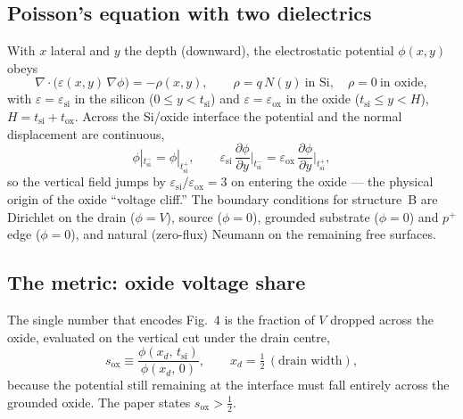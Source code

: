 \documentclass[11pt]{article}
\newcommand{\eox}{\varepsilon_{\mathrm{ox}}}
\newcommand{\esi}{\varepsilon_{\mathrm{si}}}
\newcommand{\tox}{t_{\mathrm{ox}}}
\newcommand{\tsi}{t_{\mathrm{si}}}
\begin{document}
\subsection{Poisson's equation with two dielectrics}
With $x$ lateral and $y$ the depth (downward), the electrostatic potential
$\phi(x,y)$ obeys
\begin{equation}
\nabla\!\cdot\!\big(\varepsilon(x,y)\,\nabla\phi\big) = -\rho(x,y),
\qquad
\rho = q\,N(y)\ \text{in Si},\quad \rho=0\ \text{in oxide},
\label{eq:poisson}
\end{equation}
with $\varepsilon=\esi$ in the silicon ($0\le y<\tsi$) and $\varepsilon=\eox$ in
the oxide ($\tsi\le y<H$), $H=\tsi+\tox$. Across the Si/oxide interface the
potential and the normal displacement are continuous,
\begin{equation}
\phi|_{\tsi^-}=\phi|_{\tsi^+},
\qquad
\esi\,\frac{\partial\phi}{\partial y}\Big|_{\tsi^-}
     =\eox\,\frac{\partial\phi}{\partial y}\Big|_{\tsi^+},
\label{eq:interface}
\end{equation}
so the vertical field jumps by $\esi/\eox=3$ on entering the oxide --- the physical
origin of the oxide ``voltage cliff.'' The boundary conditions for structure~B are
Dirichlet on the drain ($\phi=V$), source ($\phi=0$), grounded substrate ($\phi=0$)
and $p^{+}$ edge ($\phi=0$), and natural (zero-flux) Neumann on the remaining
free surfaces.

\subsection{The metric: oxide voltage share}
The single number that encodes Fig.~4 is the fraction of $V$ dropped across the
oxide, evaluated on the vertical cut under the drain centre,
\begin{equation}
s_{\mathrm{ox}} \equiv \frac{\phi(x_{d},\,\tsi)}{\phi(x_{d},\,0)},
\qquad x_{d}=\tfrac12\,(\text{drain width}),
\label{eq:share}
\end{equation}
because the potential still remaining at the interface must fall entirely across
the grounded oxide. The paper states $s_{\mathrm{ox}}>\tfrac12$.

\end{document}
